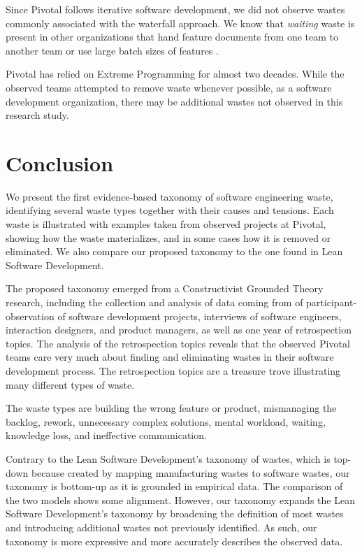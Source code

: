 Since Pivotal follows iterative software development, we did not observe wastes commonly associated with the waterfall approach. We know that \textit{waiting} waste is present in other organizations that hand feature documents from one team to another team or use large batch sizes of features \cite{Ali2016, Khurum2014, Mujtaba2010}.

Pivotal has relied on Extreme Programming for almost two decades. While the observed teams  attempted to remove waste whenever possible, as a  software development organization, there may be additional wastes not observed in this research study. 
\section{Conclusion}
\label{Conclusion}
We present the first evidence-based taxonomy of software engineering waste, identifying several waste types together with their causes and tensions. Each waste is illustrated with examples taken from observed projects at Pivotal, showing how the waste materializes, and in some cases how it is removed or eliminated. We also compare our proposed taxonomy to the one found in Lean Software Development.

The proposed taxonomy emerged from a Constructivist Grounded Theory research, including the collection and analysis of data coming from \durationOfResearchStudyPlural{} of participant-observation of  \numberOfObservedProjects{} software development projects, interviews of \numberOfInterviews{} software engineers, interaction designers, and product managers, as well as one year of retrospection topics. The analysis of the retrospection topics reveals that the observed Pivotal teams care very much about finding and eliminating wastes in their software development process. The retrospection topics are a treasure trove illustrating many different types of waste. 

The waste types are building the wrong feature or product, mismanaging the backlog, rework, unnecessary complex solutions, mental workload, waiting, knowledge loss, and ineffective communication.

Contrary to the Lean Software Development's taxonomy of wastes, which is top-down because created by mapping manufacturing wastes to software wastes, our taxonomy is bottom-up as it is grounded in empirical data. The comparison of the two models shows some alignment. However, our taxonomy expands the Lean Software Development's taxonomy by broadening the definition of most wastes and introducing additional wastes not previously identified. As such, our taxonomy is more expressive and more accurately describes the observed data.

